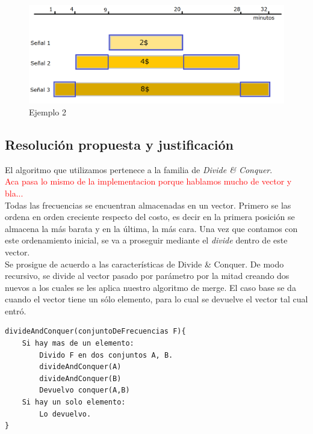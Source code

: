 \documentclass[a4paper]{article}
\begin{document}
 \begin{figure}[h!]
   \begin{center}
 	\includegraphics[scale=0.45]{imagenes/ej2/ejemplo2.png}
 	\caption{Ejemplo 2}
   \end{center}
 \end{figure}


\newpage

\subsection{Resoluci\'on propuesta y justificaci\'on}

El algoritmo que utilizamos pertenece a la familia de \emph{Divide \& Conquer}.\\

\textcolor{red}{Aca pasa lo mismo de la implementacion porque hablamos mucho de vector y bla...}\\

Todas las frecuencias se encuentran almacenadas en un vector. Primero se las ordena en orden creciente respecto del costo, es decir en la primera posición se almacena la m\'as barata y en la última, la más cara. Una vez que contamos con este ordenamiento inicial, se va a proseguir mediante el \emph{divide} dentro de este vector.\\

Se prosigue de acuerdo a las características de Divide \& Conquer. De modo recursivo, se divide al vector pasado por parámetro por la mitad creando dos nuevos a los cuales se les aplica nuestro algoritmo de merge. El caso base se da cuando el vector tiene un sólo elemento, para lo cual se devuelve el vector tal cual entró.

	\begin{codesnippet}
	\begin{verbatim}
divideAndConquer(conjuntoDeFrecuencias F){
    Si hay mas de un elemento:
        Divido F en dos conjuntos A, B.
        divideAndConquer(A)
        divideAndConquer(B)
        Devuelvo conquer(A,B)
    Si hay un solo elemento:
        Lo devuelvo.	
}
	\end{verbatim}
	\end{codesnippet}
\end{document}
